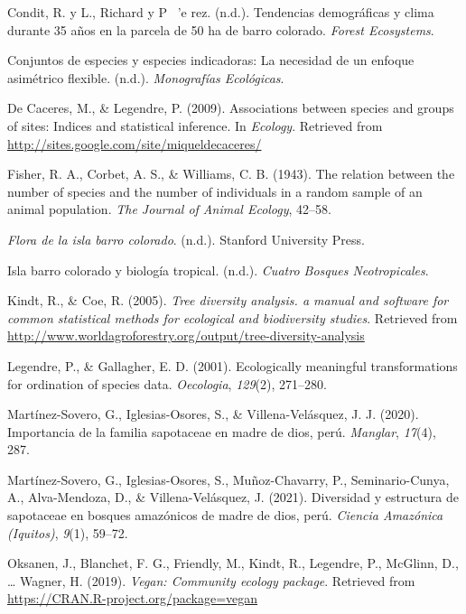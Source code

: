 \documentclass[11pt,]{article}
\begin{document}
\hypertarget{ref-condit2017demographic}{}
Condit, R. y L., Richard y P ~'e rez. (n.d.). Tendencias demográficas y
clima durante 35 años en la parcela de 50 ha de barro colorado.
\emph{Forest Ecosystems}.

\hypertarget{ref-dufrene1997species}{}
Conjuntos de especies y especies indicadoras: La necesidad de un enfoque
asimétrico flexible. (n.d.). \emph{Monografías Ecológicas}.

\hypertarget{ref-indicspecies}{}
De Caceres, M., \& Legendre, P. (2009). Associations between species and
groups of sites: Indices and statistical inference. In \emph{Ecology}.
Retrieved from \url{http://sites.google.com/site/miqueldecaceres/}

\hypertarget{ref-fisher1943relation}{}
Fisher, R. A., Corbet, A. S., \& Williams, C. B. (1943). The relation
between the number of species and the number of individuals in a random
sample of an animal population. \emph{The Journal of Animal Ecology},
42--58.

\hypertarget{ref-croat1978flora}{}
\emph{Flora de la isla barro colorado}. (n.d.). Stanford University
Press.

\hypertarget{ref-leigh1990barro}{}
Isla barro colorado y biología tropical. (n.d.). \emph{Cuatro Bosques
Neotropicales}.

\hypertarget{ref-diversityanalysis}{}
Kindt, R., \& Coe, R. (2005). \emph{Tree diversity analysis. a manual
and software for common statistical methods for ecological and
biodiversity studies}. Retrieved from
\url{http://www.worldagroforestry.org/output/tree-diversity-analysis}

\hypertarget{ref-legendre2001ecologically}{}
Legendre, P., \& Gallagher, E. D. (2001). Ecologically meaningful
transformations for ordination of species data. \emph{Oecologia},
\emph{129}(2), 271--280.

\hypertarget{ref-martinez2020importancia}{}
Martínez-Sovero, G., Iglesias-Osores, S., \& Villena-Velásquez, J. J.
(2020). Importancia de la familia sapotaceae en madre de dios, perú.
\emph{Manglar}, \emph{17}(4), 287.

\hypertarget{ref-martinez2021diversidad}{}
Martínez-Sovero, G., Iglesias-Osores, S., Muñoz-Chavarry, P.,
Seminario-Cunya, A., Alva-Mendoza, D., \& Villena-Velásquez, J. (2021).
Diversidad y estructura de sapotaceae en bosques amazónicos de madre de
dios, perú. \emph{Ciencia Amazónica (Iquitos)}, \emph{9}(1), 59--72.

\hypertarget{ref-vegan}{}
Oksanen, J., Blanchet, F. G., Friendly, M., Kindt, R., Legendre, P.,
McGlinn, D., \ldots{} Wagner, H. (2019). \emph{Vegan: Community ecology
package}. Retrieved from \url{https://CRAN.R-project.org/package=vegan}
\end{document}
